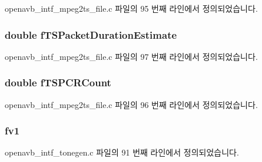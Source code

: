 openavb\+\_\+intf\+\_\+mpeg2ts\+\_\+file.\+c 파일의 95 번째 라인에서 정의되었습니다.

\subsubsection[{\texorpdfstring{f\+T\+S\+Packet\+Duration\+Estimate}{fTSPacketDurationEstimate}}]{\setlength{\rightskip}{0pt plus 5cm}double f\+T\+S\+Packet\+Duration\+Estimate}\hypertarget{structpvt__data__t_a0511da20763f2bbf2d7ad805c6a9bdd4}{}\label{structpvt__data__t_a0511da20763f2bbf2d7ad805c6a9bdd4}


openavb\+\_\+intf\+\_\+mpeg2ts\+\_\+file.\+c 파일의 97 번째 라인에서 정의되었습니다.

\subsubsection[{\texorpdfstring{f\+T\+S\+P\+C\+R\+Count}{fTSPCRCount}}]{\setlength{\rightskip}{0pt plus 5cm}double f\+T\+S\+P\+C\+R\+Count}\hypertarget{structpvt__data__t_a5e3477b3086ecf8bf79af7468ffa91b6}{}\label{structpvt__data__t_a5e3477b3086ecf8bf79af7468ffa91b6}


openavb\+\_\+intf\+\_\+mpeg2ts\+\_\+file.\+c 파일의 96 번째 라인에서 정의되었습니다.

\subsubsection[{\texorpdfstring{fv1}{fv1}}]{ fv1}\hypertarget{structpvt__data__t_af0d968d4212147c6c8f84d8bfaa1de61}{}\label{structpvt__data__t_af0d968d4212147c6c8f84d8bfaa1de61}


openavb\+\_\+intf\+\_\+tonegen.\+c 파일의 91 번째 라인에서 정의되었습니다.

